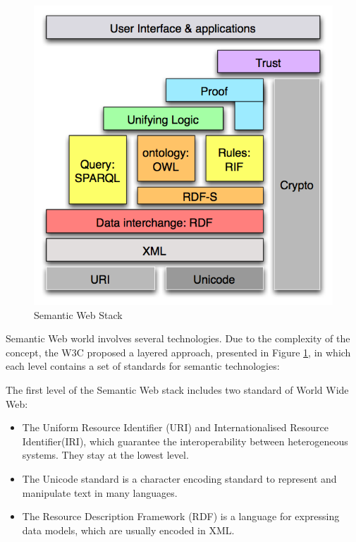 \begin{figure}[tbh]
  \centering
	\includegraphics[width=0.75\linewidth]{images/semantic_web_stack}
	\caption{Semantic Web Stack} 
  	\label{fig:semantic-web-stack}
\end{figure}
 

Semantic Web world involves several technologies. Due to the complexity of the concept, the W3C proposed a layered approach, presented in Figure \ref{fig:semantic-web-stack}, in which each level contains a set of standards for semantic technologies:

The first level of the Semantic Web stack includes  two standard of World Wide Web:
\begin{itemize}
\item  The Uniform Resource Identifier (URI)  and Internationalised Resource Identifier(IRI), which guarantee the interoperability between heterogeneous systems. They stay at the lowest level.
\item  The Unicode standard is a character encoding standard to represent and manipulate text in many languages.
\item The Resource Description Framework (RDF) is a language for expressing data models, which are usually encoded in XML.
\end{itemize}

